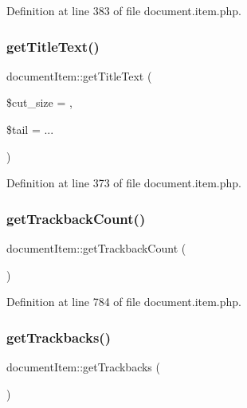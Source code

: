 Definition at line 383 of file document.\+item.\+php.

\mbox{\label{classdocumentItem_aad953dc30cf01a1d451cb90c66c09b0c}} 
\subsubsection{\texorpdfstring{get\+Title\+Text()}{getTitleText()}}
{\footnotesize\ttfamily document\+Item\+::get\+Title\+Text (\begin{DoxyParamCaption}\item[{}]{\$cut\+\_\+size = {},  }\item[{}]{\$tail = {\ttfamily \textquotesingle{}...\textquotesingle{}} }\end{DoxyParamCaption})}



Definition at line 373 of file document.\+item.\+php.

\mbox{\label{classdocumentItem_af1520e91e8dd49202cfb93909db61c48}} 
\subsubsection{\texorpdfstring{get\+Trackback\+Count()}{getTrackbackCount()}}
{\footnotesize\ttfamily document\+Item\+::get\+Trackback\+Count (\begin{DoxyParamCaption}{ }\end{DoxyParamCaption})}



Definition at line 784 of file document.\+item.\+php.

\mbox{\label{classdocumentItem_a0c69601e59c290048081bf8d8aa7602e}} 
\subsubsection{\texorpdfstring{get\+Trackbacks()}{getTrackbacks()}}
{\footnotesize\ttfamily document\+Item\+::get\+Trackbacks (\begin{DoxyParamCaption}{ }\end{DoxyParamCaption})}



